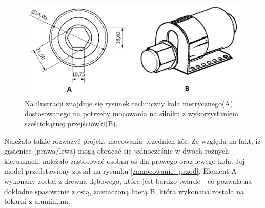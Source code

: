  \begin{figure}[H]
    \begin{center}
      \includegraphics[scale=0.40]{imgs/moc_kol_tyl.png}
 	\caption[Model tylnych kół.]{\small{Na ilustracji znajduje się rysunek techniczny koła metrycznego(A) dostosowanego na potrzeby mocowania na silniku z wykorzystaniem sześciokątnej przejściówki(B).}}
	\label{zamocowanie_szesciokatne}
    \end{center}
  \end{figure}

Należało także rozważyć projekt mocowania przednich kół. Ze względu na fakt, iż gąsienice (prawa/lewa) mogą obracać się jednocześnie w dwóch rożnych kierunkach, należało zastosować osobną oś dla prawego oraz lewego koła. Jej model przedstawiony został na rysunku \ref{zamocowanie_przod}. Element A wykonany został z drewna dębowego, które jest bardzo twarde - co pozwala na dokładne spasowanie z osią, zaznaczoną literą B, która wykonana została na tokarni z aluminium.

